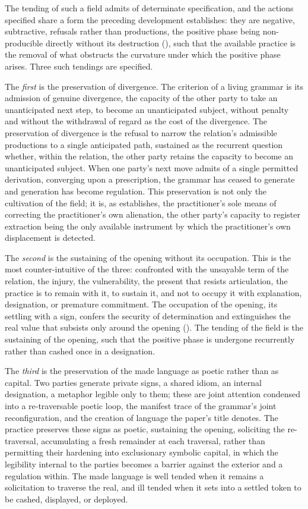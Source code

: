 The tending of such a field admits of determinate specification, and the actions specified share a form the preceding development establishes: they are negative, subtractive, refusals rather than productions, the positive phase being non-producible directly without its destruction (), such that the available practice is the removal of what obstructs the curvature under which the positive phase arises. Three such tendings are specified.

The \emph{first} is the preservation of divergence. The criterion of a living grammar is its admission of genuine divergence, the capacity of the other party to take an unanticipated next step, to become an unanticipated subject, without penalty and without the withdrawal of regard as the cost of the divergence. The preservation of divergence is the refusal to narrow the relation's admissible productions to a single anticipated path, sustained as the recurrent question whether, within the relation, the other party retains the capacity to become an unanticipated subject. When one party's next move admits of a single permitted derivation, converging upon a prescription, the grammar has ceased to generate and generation has become regulation. This preservation is not only the cultivation of the field; it is, as  establishes, the practitioner's sole means of correcting the practitioner's own alienation, the other party's capacity to register extraction being the only available instrument by which the practitioner's own displacement is detected.

The \emph{second} is the sustaining of the opening without its occupation. This is the most counter-intuitive of the three: confronted with the unsayable term of the relation, the injury, the vulnerability, the present that resists articulation, the practice is to remain with it, to sustain it, and not to occupy it with explanation, designation, or premature commitment. The occupation of the opening, its settling with a sign, confers the security of determination and extinguishes the real value that subsists only around the opening (). The tending of the field is the sustaining of the opening, such that the positive phase is undergone recurrently rather than cashed once in a designation.

The \emph{third} is the preservation of the made language as poetic rather than as capital. Two parties generate private signs, a shared idiom, an internal designation, a metaphor legible only to them; these are joint attention condensed into a re-traversable poetic loop, the manifest trace of the grammar's joint reconfiguration, and the creation of language the paper's title denotes. The practice preserves these signs as poetic, sustaining the opening, soliciting the re-traversal, accumulating a fresh remainder at each traversal, rather than permitting their hardening into exclusionary symbolic capital, in which the legibility internal to the parties becomes a barrier against the exterior and a regulation within. The made language is well tended when it remains a solicitation to traverse the real, and ill tended when it sets into a settled token to be cashed, displayed, or deployed.

